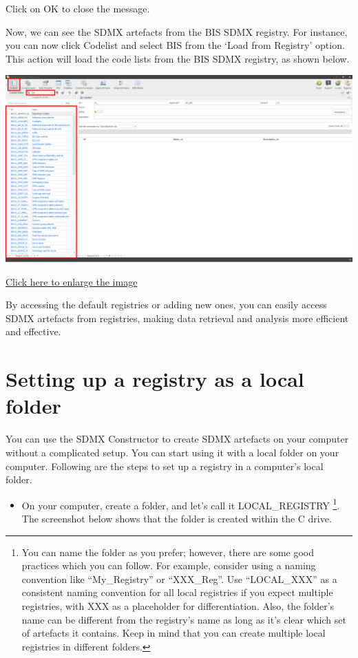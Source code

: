 \documentclass[
]{book}
\providecommand{\tightlist}{%
  \setlength{\itemsep}{0pt}\setlength{\parskip}{0pt}}
\begin{document}
Click on OK to close the message.

Now, we can see the SDMX artefacts from the BIS SDMX registry. For instance, you can now click Codelist and select BIS from the `Load from Registry' option. This action will load the code lists from the BIS SDMX registry, as shown below.

\begin{center}\includegraphics[width=1\linewidth]{./images/image238} \end{center}

\href{images/image238.png}{Click here to enlarge the image}

By accessing the default registries or adding new ones, you can easily access SDMX artefacts from registries, making data retrieval and analysis more efficient and effective.

\hypertarget{setting-up}{%
\section{Setting up a registry as a local folder}\label{setting-up}}

You can use the SDMX Constructor to create SDMX artefacts on your computer without a complicated setup. You can start using it with a local folder on your computer. Following are the steps to set up a registry in a computer's local folder.

\begin{itemize}
\tightlist
\item
  On your computer, create a folder, and let's call it LOCAL\_REGISTRY \footnote{You can name the folder as you prefer; however, there are some good practices which you can follow. For example, consider using a naming convention like ``My\_Registry'' or ``XXX\_Reg''. Use ``LOCAL\_XXX'' as a consistent naming convention for all local registries if you expect multiple registries, with XXX as a placeholder for differentiation. Also, the folder's name can be different from the registry's name as long as it's clear which set of artefacts it contains. Keep in mind that you can create multiple local registries in different folders.}. The screenshot below shows that the folder is created within the C drive.
\end{itemize}
\end{document}
